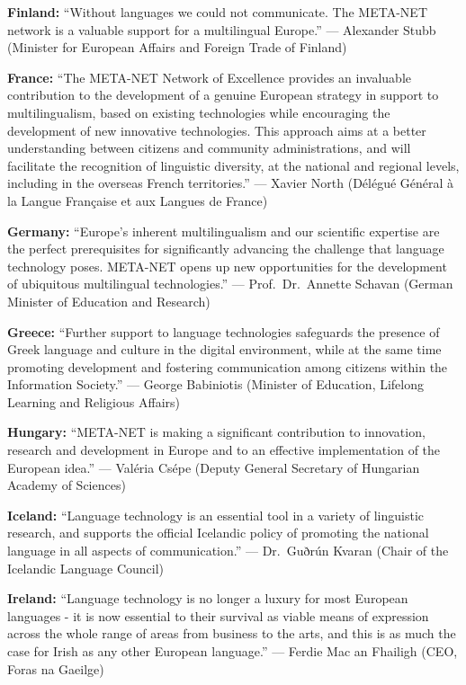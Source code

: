 \documentclass[10pt, plain]{../../metanetpaper}
\begin{document}
\bigskip \textbf{Finland:} ``Without languages we could not communicate. The META-NET network is a valuable support for a multilingual Europe.'' --- Alexander Stubb (Minister for European Affairs and Foreign Trade of Finland)

\bigskip \textbf{France:} ``The META-NET Network of Excellence provides an invaluable contribution to the development of a genuine European strategy in support to multilingualism, based on existing technologies while encouraging the development of new innovative technologies. This approach aims at a better understanding between citizens and community administrations, and will facilitate the recognition of linguistic diversity, at the national and regional levels, including in the overseas French territories.'' --- Xavier North (Délégué Général à la Langue Française et aux Langues de France)

\bigskip \textbf{Germany:} ``Europe's inherent multilingualism and our scientific expertise are the perfect prerequisites for significantly advancing the challenge that language technology poses. META-NET opens up new opportunities for the development of ubiquitous multilingual technologies.'' --- Prof.~Dr.~Annette Schavan (German Minister of Education and Research)

\bigskip \textbf{Greece:} ``Further support to language technologies safeguards the presence of Greek language and culture in the digital environment, while at the same time promoting development and fostering communication among citizens within the Information Society.'' --- George Babiniotis (Minister of Education, Lifelong Learning and Religious Affairs)

\bigskip \textbf{Hungary:} ``META-NET is making a significant contribution to innovation, research and development in Europe and to an effective implementation of the European idea.'' --- Valéria Csépe (Deputy General Secretary of Hungarian Academy of Sciences)

\bigskip \textbf{Iceland:} ``Language technology is an essential tool in a variety of linguistic research, and supports the official Icelandic policy of promoting the national language in all aspects of communication.'' --- Dr.~Guðrún Kvaran (Chair of the Icelandic Language Council)

\bigskip \textbf{Ireland:} ``Language technology is no longer a luxury for most European languages - it is now essential to their survival as viable means of expression across the whole range of areas from business to the arts, and this is as much the case for Irish as any other European language.'' --- Ferdie Mac an Fhailigh (CEO, Foras na Gaeilge)
\end{document}
